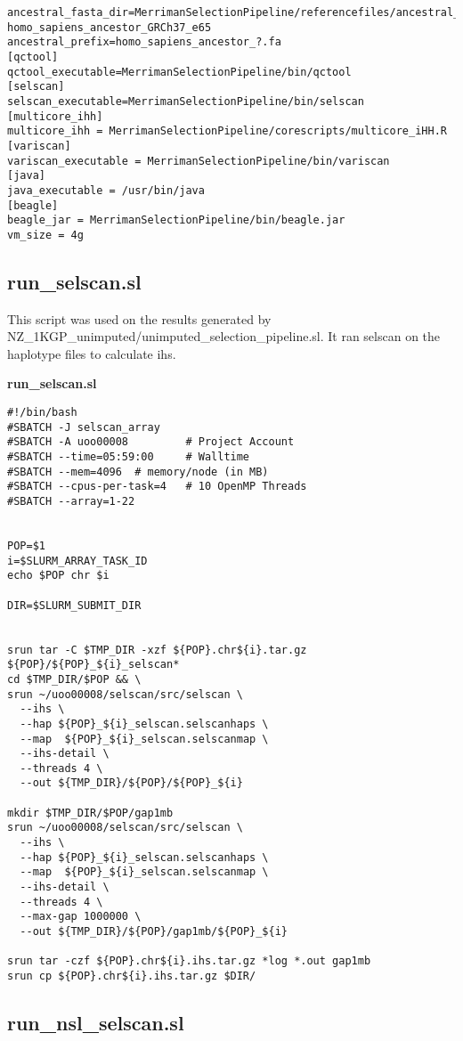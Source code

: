\documentclass[twoside,openright]{report}
\begin{document}
\begin{appendices}
\begin{verbatim}
ancestral_fasta_dir=MerrimanSelectionPipeline/referencefiles/ancestral_ref/\
homo_sapiens_ancestor_GRCh37_e65
ancestral_prefix=homo_sapiens_ancestor_?.fa
[qctool]
qctool_executable=MerrimanSelectionPipeline/bin/qctool
[selscan]
selscan_executable=MerrimanSelectionPipeline/bin/selscan
[multicore_ihh]
multicore_ihh = MerrimanSelectionPipeline/corescripts/multicore_iHH.R
[variscan]
variscan_executable = MerrimanSelectionPipeline/bin/variscan
[java]
java_executable = /usr/bin/java
[beagle]
beagle_jar = MerrimanSelectionPipeline/bin/beagle.jar
vm_size = 4g
\end{verbatim}

\subsection{run\_selscan.sl}\label{run_selscan.sl}

This script was used on the results generated by
NZ\_1KGP\_unimputed/unimputed\_selection\_pipeline.sl. It ran selscan on
the haplotype files to calculate \gls{ihs}.

\textbf{run\_selscan.sl}

\begin{verbatim}
#!/bin/bash
#SBATCH -J selscan_array
#SBATCH -A uoo00008         # Project Account
#SBATCH --time=05:59:00     # Walltime
#SBATCH --mem=4096  # memory/node (in MB)
#SBATCH --cpus-per-task=4   # 10 OpenMP Threads
#SBATCH --array=1-22


POP=$1
i=$SLURM_ARRAY_TASK_ID
echo $POP chr $i

DIR=$SLURM_SUBMIT_DIR


srun tar -C $TMP_DIR -xzf ${POP}.chr${i}.tar.gz ${POP}/${POP}_${i}_selscan* 
cd $TMP_DIR/$POP && \
srun ~/uoo00008/selscan/src/selscan \
  --ihs \
  --hap ${POP}_${i}_selscan.selscanhaps \
  --map  ${POP}_${i}_selscan.selscanmap \
  --ihs-detail \
  --threads 4 \
  --out ${TMP_DIR}/${POP}/${POP}_${i}
  
mkdir $TMP_DIR/$POP/gap1mb
srun ~/uoo00008/selscan/src/selscan \
  --ihs \
  --hap ${POP}_${i}_selscan.selscanhaps \
  --map  ${POP}_${i}_selscan.selscanmap \
  --ihs-detail \
  --threads 4 \
  --max-gap 1000000 \
  --out ${TMP_DIR}/${POP}/gap1mb/${POP}_${i}

srun tar -czf ${POP}.chr${i}.ihs.tar.gz *log *.out gap1mb
srun cp ${POP}.chr${i}.ihs.tar.gz $DIR/
\end{verbatim}

\subsection{run\_nsl\_selscan.sl}\label{run_nsl_selscan.sl}


\end{appendices}
\end{document}
